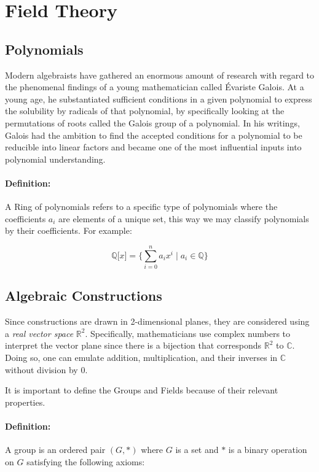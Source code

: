 \documentclass{article}
\begin{document}
\section{Field Theory}
\subsection{Polynomials}
 Modern algebraists have gathered an enormous amount of research with regard to the phenomenal findings of a young mathematician called Évariste Galois.  At a young age, he substantiated sufficient conditions in a given polynomial to express the solubility by radicals of that polynomial, by specifically looking at the permutations of roots called the Galois group of a polynomial. In his writings, Galois had the ambition to find the accepted conditions for a polynomial to be reducible into linear factors and became one of the most influential inputs into polynomial understanding. 

\par
\paragraph{Definition:} A Ring of polynomials refers to a specific type of polynomials where the coefficients $a_i$ are elements of a unique set, this way we may classify polynomials by their coefficients. For example:

$$\mathbb{Q}\lbrack x\rbrack=\lbrace \sum_{i=0}^{n}a_{i}x^{i} \mid a_i\in\mathbb{Q}\rbrace$$



\subsection{Algebraic Constructions}
Since constructions are drawn in  2-dimensional planes, they are considered using a \textit{real vector space} $\mathbb{R}^{2}$. Specifically, mathematicians use complex numbers to interpret the vector plane since there is a bijection that corresponds $\mathbb{R}^{2}$ to $\mathbb{C}$. Doing so, one can emulate addition, multiplication, and their inverses in $\mathbb{C}$ without division by $0$.

\par
It is important to define the Groups and Fields because of their relevant properties.
\paragraph{Definition:} 
A group is an ordered pair $(G,\ast)$ where $G$ is a set and $\ast$ is a binary operation on $G$ satisfying the following axioms:
\end{document}
